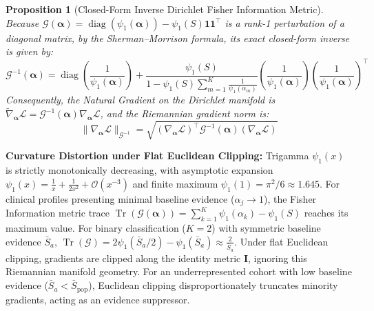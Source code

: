 \documentclass[3p,12pt]{elsarticle}
\theoremstyle{plain}
\newtheorem{proposition}[theorem]{Proposition}
\theoremstyle{definition}
\begin{document}
\begin{proposition}[Closed-Form Inverse Dirichlet Fisher Information Metric]
\label{prop:inverse_fisher}
Because $\mathcal{G}(\boldsymbol{\alpha}) = \operatorname{diag}(\psi_1(\boldsymbol{\alpha})) - \psi_1(S) \mathbf{1}\mathbf{1}^\top$ is a rank-1 perturbation of a diagonal matrix, by the Sherman--Morrison formula, its exact closed-form inverse is given by:
\begin{equation}
    \mathcal{G}^{-1}(\boldsymbol{\alpha}) = \operatorname{diag}\left(\frac{1}{\psi_1(\boldsymbol{\alpha})}\right) + \frac{\psi_1(S)}{1 - \psi_1(S) \sum_{m=1}^K \frac{1}{\psi_1(\alpha_m)}} \left(\frac{1}{\psi_1(\boldsymbol{\alpha})}\right) \left(\frac{1}{\psi_1(\boldsymbol{\alpha})}\right)^\top
\end{equation}
Consequently, the Natural Gradient on the Dirichlet manifold is $\widetilde{\nabla}_{\boldsymbol{\alpha}} \mathcal{L} = \mathcal{G}^{-1}(\boldsymbol{\alpha}) \nabla_{\boldsymbol{\alpha}} \mathcal{L}$, and the Riemannian gradient norm is:
\begin{equation}
    \|\nabla_{\boldsymbol{\alpha}} \mathcal{L}\|_{\mathcal{G}^{-1}} = \sqrt{(\nabla_{\boldsymbol{\alpha}} \mathcal{L})^\top \mathcal{G}^{-1}(\boldsymbol{\alpha}) (\nabla_{\boldsymbol{\alpha}} \mathcal{L})}
\end{equation}
\end{proposition}\noindent \textbf{Curvature Distortion under Flat Euclidean Clipping:} Trigamma $\psi_1(x)$ is strictly monotonically decreasing, with asymptotic expansion $\psi_1(x) = \frac{1}{x} + \frac{1}{2x^2} + \mathcal{O}(x^{-3})$ and finite maximum $\psi_1(1) = \pi^2/6 \approx 1.645$. For clinical profiles presenting minimal baseline evidence ($\alpha_j \to 1$), the Fisher Information metric trace $\operatorname{Tr}(\mathcal{G}(\boldsymbol{\alpha})) = \sum_{k=1}^K \psi_1(\alpha_k) - \psi_1(S)$ reaches its maximum value. For binary classification ($K=2$) with symmetric baseline evidence $\bar{S}_a$, $\operatorname{Tr}(\mathcal{G}) = 2\psi_1(\bar{S}_a/2) - \psi_1(\bar{S}_a) \approx \frac{2}{\bar{S}_a}$. Under flat Euclidean clipping, gradients are clipped along the identity metric $\mathbf{I}$, ignoring this Riemannian manifold geometry. For an underrepresented cohort with low baseline evidence ($\bar{S}_a < \bar{S}_{\text{pop}}$), Euclidean clipping disproportionately truncates minority gradients, acting as an evidence suppressor.
\end{document}
